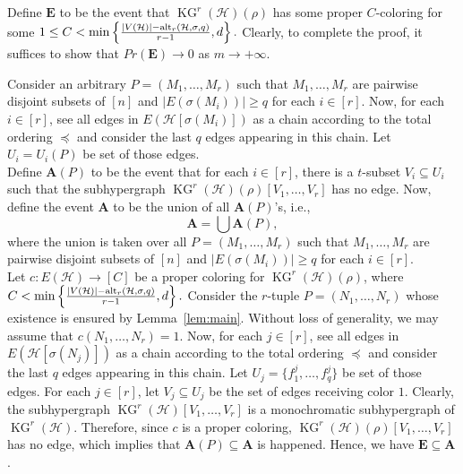 \documentclass[11pt]{amsart}
\theoremstyle{definition}
\theoremstyle{remark}
\def\KG{\operatorname{KG}}
\begin{document}
  Define $\mathbf{E}$ to be the event that $\KG^r(\mathcal{H})(\rho)$ has some proper $C$-coloring for some $1\leq C<\min\left\{{|V(\mathcal{H})|-{\rm alt}_r(\mathcal{H},\sigma,q)\over r-1},d\right\}.$
Clearly, to complete the proof, it suffices to show that $Pr(\mathbf{E})\rightarrow 0$ as $m\rightarrow +\infty$.  

Consider an arbitrary $P=(M_1,\ldots,M_r)$ 
such that $M_1,\ldots, M_r$ 
are pairwise disjoint subsets of $[n]$ and 
$|E(\sigma(M_i))|\geq q$ for each $i\in [r]$. Now, for each $i\in[r]$, 
see all edges in $E(\mathcal{H}[\sigma(M_i)])$ as a chain 
according to the total ordering $\preceq$ and 
consider the last $q$ edges appearing in this chain. 
Let $U_i=U_i(P)$ be set of those edges. \\

Define $\mathbf{A}(P)$ to be the event that for each $i\in [r]$, there is
a $t$-subset $V_i\subseteq U_i$ such that 
the subhypergraph $\KG^r(\mathcal{H})(\rho)[V_1,\ldots,V_r]$
has no edge. 
Now, define the event $\mathbf{A}$ to be the union of all $\mathbf{A}(P)$'s, i.e., 
 $$\mathbf{A}=\bigcup \mathbf{A}(P),$$
where the union is taken over all $P=(M_1,\ldots,M_r)$  
such that $M_1,\ldots,M_r$ 
are pairwise disjoint subsets of $[n]$ and
$|E(\sigma(M_i))|\geq q$ 
for each $i\in [r]$.\\

Let $c:E(\mathcal{H})\longrightarrow [C]$ be a proper coloring for $\KG^r(\mathcal{H})(\rho)$,
where $C<\min\left\{{|V(\mathcal{H})|-{\rm alt}_r(\mathcal{H},\sigma,q)\over r-1},d\right\}.$ 
Consider the $r$-tuple  $P=(N_1,\ldots,N_r)$ whose existence is 
ensured by Lemma~\ref{lem:main}. Without loss of generality, we may assume that 
$c(N_1,\ldots,N_r)=1$.
Now, for each $j\in[r]$, 
see all edges in $E(\mathcal{H}[\sigma(N_j)])$ as a chain 
according to the total ordering $\preceq$ and 
consider the last $q$ edges appearing in this chain. 
Let $U_j=\{f_1^j,\ldots,f_q^j\}$ be set of those edges.  
For each $j\in[r]$, let 
$V_{j}\subseteq U_j$ be the set of edges receiving color $1$.  
Clearly,  the subhypergraph 
$\KG^r(\mathcal{H})[V_1,\ldots,V_r]$ is a monochromatic subhypergraph of 
$\KG^r(\mathcal{H})$. Therefore, since $c$ is a proper coloring,  $\KG^r(\mathcal{H})(\rho)[V_1,\ldots,V_r]$  has no edge, which implies that $\mathbf{A}(P)\subseteq \mathbf{A}$ is happened. Hence, we have $\mathbf{E}\subseteq \mathbf{A}$.
 
\end{document}
